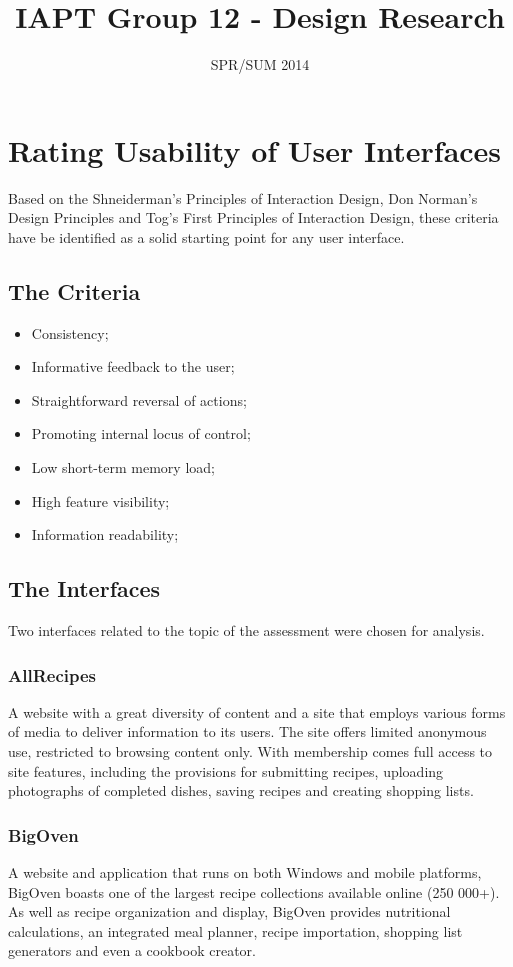 \documentclass{article}
\title{IAPT Group 12 - Design Research}
\date{SPR/SUM 2014}
\begin{document}
\maketitle
\clearpage

\section*{Rating Usability of User Interfaces}
Based on the Shneiderman's Principles of Interaction Design, Don Norman's Design Principles and Tog's First Principles of Interaction Design, these criteria have be identified as a solid starting point for any user interface.

\subsection*{The Criteria}
\begin{itemize}
\item Consistency;
\item Informative feedback to the user;
\item Straightforward reversal of actions;
\item Promoting internal locus of control;
\item Low short-term memory load;
\item High feature visibility;
\item Information readability;
\end{itemize}

\clearpage

\subsection*{The Interfaces}
Two interfaces related to the topic of the assessment were chosen for analysis.

\subsubsection*{AllRecipes}
A website with a great diversity of content and a site that employs various forms 
of media to deliver information to its users. The site offers limited anonymous
use, restricted to browsing content only. With membership comes full access to 
site features, including the provisions for submitting recipes, uploading
photographs of completed dishes, saving recipes and creating shopping lists.

\subsubsection*{BigOven}
A website and application that runs on both Windows and mobile platforms, BigOven
boasts one of the largest recipe collections available online (250 000+). As well
as recipe organization and display, BigOven provides nutritional calculations,
an integrated meal planner, recipe importation, shopping list generators and even 
a cookbook creator.
\end{document}
